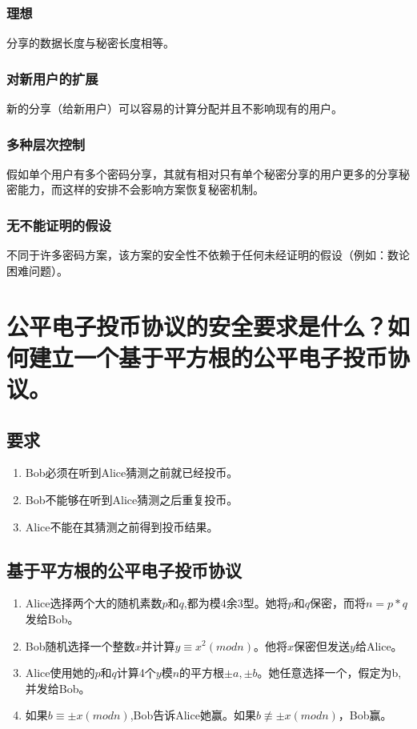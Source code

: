 \documentclass[11pt,a4paper]{article}
\begin{document}
\subsubsection{理想}分享的数据长度与秘密长度相等。
\subsubsection{对新用户的扩展}新的分享（给新用户）可以容易的计算分配并且不影响现有的用户。
\subsubsection{多种层次控制}假如单个用户有多个密码分享，其就有相对只有单个秘密分享的用户更多的分享秘密能力，而这样的安排不会影响方案恢复秘密机制。
\subsubsection{无不能证明的假设}不同于许多密码方案，该方案的安全性不依赖于任何未经证明的假设（例如：数论困难问题）。
\section{公平电子投币协议的安全要求是什么？如何建立一个基于平方根的公平电子投币协议。}

\subsection{要求}
\begin{enumerate}[(1)]
\item Bob必须在听到Alice猜测之前就已经投币。
\item Bob不能够在听到Alice猜测之后重复投币。
\item Alice不能在其猜测之前得到投币结果。
\end{enumerate}
\subsection{基于平方根的公平电子投币协议}
\begin{enumerate}
\item Alice选择两个大的随机素数$p$和$q$,都为模4余3型。她将$p$和$q$保密，而将$n=p*q$发给Bob。
\item Bob随机选择一个整数$x$并计算$y \equiv x^2(mod n)$。他将$x$保密但发送$y$给Alice。
\item Alice使用她的$p$和$q$计算4个$y$模$n$的平方根$\pm a,\pm b$。她任意选择一个，假定为b,并发给Bob。
\item 如果$b\equiv \pm x(mod n)$,Bob告诉Alice她赢。如果$b \not\equiv\pm x(mod n)$，Bob赢。
\end{enumerate}
\end{document}
